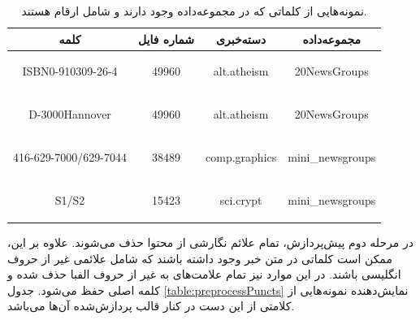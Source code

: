 \documentclass[11.5pt,a4paper]{article}
\begin{document}
\begin{table}[h]
\center
\caption{نمونه‌هایی از کلماتی که در مجموعه‌داده وجود دارند و شامل ارقام هستند.}
\label{table:preprocessDigits}
\begin{tabular}{c | c | c | c}
کلمه & شماره فایل & دسته‌خبری & مجموعه‌داده\\
\hline
\hline
	\begin{latin}
	ISBN0-910309-26-4 
	\end{latin}
	& 49960 & 
	\begin{latin}
	alt.atheism 
	\end{latin}
	& 
	\begin{latin}
	20NewsGroups
	\end{latin}
\\
	\begin{latin}
	D-3000Hannover
	\end{latin}
	& 49960 & 
	\begin{latin}
	alt.atheism
	\end{latin}
	& 
	\begin{latin}
	20NewsGroups
	\end{latin}
\\
	\begin{latin}
	416-629-7000/629-7044
	\end{latin}
	&38489&
	\begin{latin}
	comp.graphics
	\end{latin}
	&
	\begin{latin}
	mini\_newsgroups
	\end{latin}
\\
	\begin{latin}
	S1/S2
	\end{latin}
	&15423&
	\begin{latin}
	sci.crypt
	\end{latin}
	&
	\begin{latin}
	mini\_newsgroups
	\end{latin}
\end{tabular}
\end{table}

در مرحله دوم پیش‌پردازش، تمام علائم نگارشی از محتوا حذف می‌شوند. علاوه بر این، ممکن است کلماتی در متن خبر وجود داشته باشند که شامل علائمی غیر از حروف انگلیسی باشند. در این موارد نیز تمام علامت‌های به غیر از حروف الفبا حذف شده و کلمه اصلی حفظ می‌شود. جدول \ref{table:preprocessPuncts}
نمایش‌دهنده نمونه‌هایی از کلامتی از این دست در کنار قالب پردازش‌شده آن‌ها می‌باشد.
\end{document}
